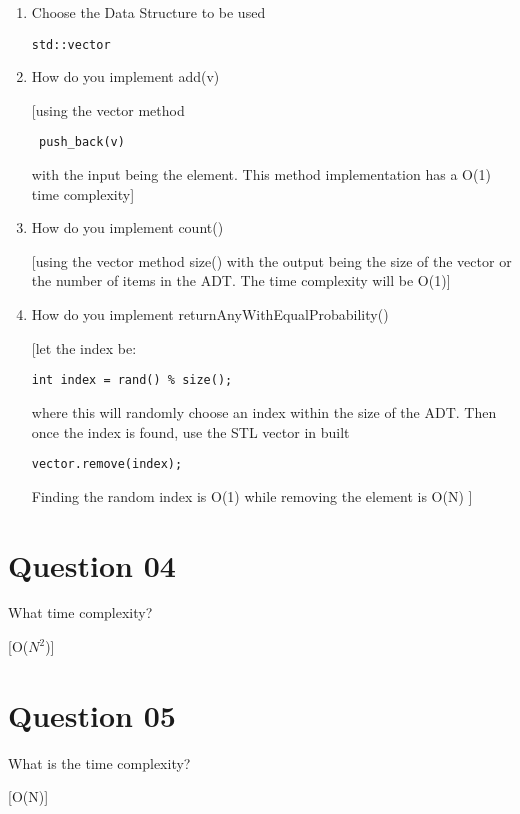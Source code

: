 \documentclass{article}
\begin{document}
\begin{enumerate}[label=(\arabic*)]
\item Choose the Data Structure to be used

\begin{verbatim}
std::vector
\end{verbatim}

\item How do you implement add(v)

[using the vector method \begin{verbatim} push_back(v)\end{verbatim} with the input being the element. This method
implementation has a O(1) time complexity]

\item How do you implement count()

[using the vector method size() with the output being the size of the vector or the number of items in the ADT. The time
complexity will be O(1)]

\item How do you implement returnAnyWithEqualProbability()

[let the index be: \begin{verbatim}
int index = rand() % size();
\end{verbatim}
where this will randomly choose an index within the size of the ADT. Then once the index is found, use the STL vector in built \begin{verbatim} 
vector.remove(index);
\end{verbatim}
Finding the random index is O(1) while removing the element is O(N)
]

\end{enumerate}

\section{Question 04}

\item What time complexity?

[O($N^2$)]

\section{Question 05}

\item What is the time complexity?

[O(N)]
\end{document}
